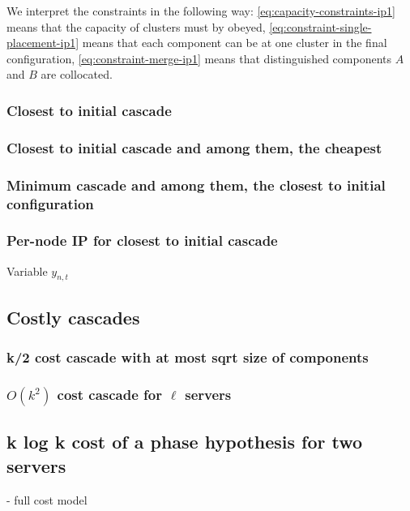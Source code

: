 \documentclass[a4paper,USenglish]{lipics-v2019}
\begin{document}
We interpret the constraints in the following way: \ref{eq:capacity-constraints-ip1}  means that the capacity of clusters must by obeyed, \ref{eq:constraint-single-placement-ip1} means that each component can be at one cluster in the final configuration, \ref{eq:constraint-merge-ip1} means that distinguished components $A$ and $B$ are collocated.

\subsubsection{Closest to initial cascade}

\subsubsection{Closest to initial cascade and among them, the cheapest}

\subsubsection{Minimum cascade and among them, the closest to initial configuration}

\subsubsection{Per-node IP for closest to initial cascade}

Variable $y_{n,t}$

\subsection{Costly cascades}

\subsubsection{k/2 cost cascade with at most sqrt size of components}

\subsubsection{$O(k^2)$ cost cascade for $\ell$ servers}

\subsection{k log k cost of a phase hypothesis for two servers}

- full cost model

  
  


\appendix
\end{document}
